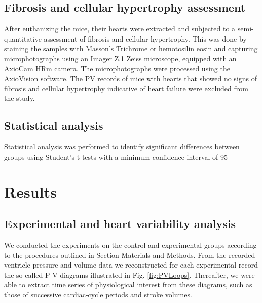 \documentclass[%
preprint,
 amsmath,amssymb,
 aps,
]{revtex4-2}
\begin{document}
\subsection{Fibrosis and cellular hypertrophy assessment}

After euthanizing the mice, their hearts were extracted and subjected to a semi-quantitative assessment of fibrosis and cellular hypertrophy. This was done by staining the samples with Masson's Trichrome or hemotosilin eosin and capturing microphotographs using an Imager Z.1 Zeiss microscope, equipped with an AxioCam HRm camera. The microphotographs were processed using the AxioVision software. The PV records of mice with hearts that showed no signs of fibrosis and cellular hypertrophy indicative of heart failure were excluded from the study.

\subsection{Statistical analysis}

Statistical analysis was performed to identify significant differences between groups using Student's t-tests with a minimum confidence interval of 95%

\section{\label{sec:res}Results}

\subsection{\label{sec:conclu}Experimental and heart variability analysis}

We conducted the experiments on the control and experimental groups according to the procedures outlined in Section Materials and Methods. From the recorded ventricle pressure and volume data we reconstructed for each experimental record the so-called P-V diagrams illustrated in Fig. \ref{fig:PVLoops}. Thereafter, we were able to extract time series of physiological interest from these diagrams, such as those of successive cardiac-cycle periods and stroke volumes.
\end{document}
